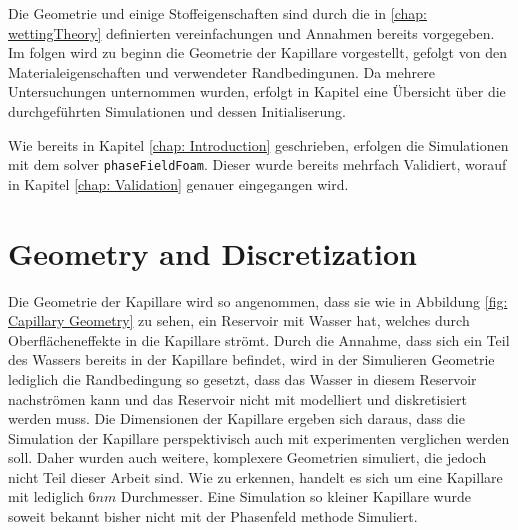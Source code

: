 Die Geometrie und einige Stoffeigenschaften sind durch die in \ref{chap: wettingTheory} definierten vereinfachungen und Annahmen bereits vorgegeben. Im folgen wird zu beginn die Geometrie der Kapillare vorgestellt, gefolgt von den Materialeigenschaften und verwendeter Randbedingunen. Da mehrere Untersuchungen unternommen wurden, erfolgt in Kapitel  eine Übersicht über die durchgeführten Simulationen und dessen Initialiserung. 


Wie bereits in Kapitel \ref{chap: Introduction} geschrieben, erfolgen die Simulationen mit dem solver \texttt{phaseFieldFoam}. Dieser wurde bereits mehrfach Validiert, worauf in Kapitel \ref{chap: Validation} genauer eingegangen wird. 
\section{Geometry and Discretization}
Die Geometrie der Kapillare wird so angenommen, dass sie wie in Abbildung \ref{fig: Capillary Geometry} zu sehen, ein Reservoir mit Wasser hat, welches durch Oberflächeneffekte in die Kapillare strömt. Durch die Annahme, dass sich ein Teil des Wassers bereits in der Kapillare befindet, wird in der Simulieren Geometrie lediglich die Randbedingung so gesetzt, dass das Wasser in diesem Reservoir nachströmen kann und das Reservoir nicht mit modelliert und diskretisiert werden muss. Die Dimensionen der Kapillare ergeben sich daraus, dass die Simulation der Kapillare perspektivisch auch mit experimenten verglichen werden soll. Daher wurden auch weitere, komplexere Geometrien simuliert, die jedoch nicht Teil dieser Arbeit sind. 
Wie zu erkennen, handelt es sich um eine Kapillare mit lediglich $6nm$ Durchmesser. Eine Simulation so kleiner Kapillare wurde soweit bekannt bisher nicht mit der Phasenfeld methode Simuliert.


